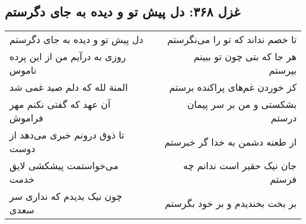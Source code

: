 \begin{center}
\section*{غزل ۳۶۸: دل پیش تو و دیده به جای دگرستم}
\label{sec:368}
\begin{longtable}{l p{0.5cm} r}
دل پیش تو و دیده به جای دگرستم
&&
تا خصم نداند که تو را می‌نگرستم
\\
روزی به درآیم من از این پرده ناموس
&&
هر جا که بتی چون تو ببینم بپرستم
\\
المنة لله که دلم صید غمی شد
&&
کز خوردن غم‌های پراکنده برستم
\\
آن عهد که گفتی نکنم مهر فراموش
&&
بشکستی و من بر سر پیمان درستم
\\
تا ذوق درونم خبری می‌دهد از دوست
&&
از طعنه دشمن به خدا گر خبرستم
\\
می‌خواستمت پیشکشی لایق خدمت
&&
جان نیک حقیر است ندانم چه فرستم
\\
چون نیک بدیدم که نداری سر سعدی
&&
بر بخت بخندیدم و بر خود بگرستم
\\
\end{longtable}
\end{center}
